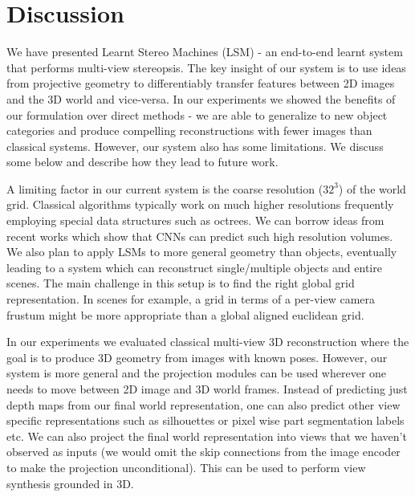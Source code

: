 \documentclass[../thesis.tex]{subfiles}
\begin{document}


\section{Discussion}
We have presented Learnt Stereo Machines (LSM) - an end-to-end learnt system that performs multi-view stereopsis. The key insight of our system is to use ideas from projective geometry to differentiably transfer features between 2D images and the 3D world and vice-versa. In our experiments we showed the benefits of our formulation over direct methods - we are able to generalize to new object categories and produce compelling reconstructions with fewer images than classical systems. However, our system also has some limitations. We discuss some below and describe how they lead to future work.

A limiting factor in our current system is the coarse resolution ($32^3$) of the world grid. Classical algorithms typically work on much higher resolutions frequently employing special data structures such as octrees. We can borrow ideas from recent works \cite{riegler2017octnetfusion,hane2017hierarchical} which show that CNNs can predict such high resolution volumes. We also plan to apply LSMs to more general geometry than objects, eventually leading to a system which can reconstruct single/multiple objects and entire scenes. The main challenge in this setup is to find the right global grid representation. In scenes for example, a grid in terms of a per-view camera frustum might be more appropriate than a global aligned euclidean grid.

In our experiments we evaluated classical multi-view 3D reconstruction where the goal is to produce 3D geometry from images with known poses. However, our system is more general and the projection modules can be used wherever one needs to move between 2D image and 3D world frames. Instead of predicting just depth maps from our final world representation, one can also predict other view specific representations such as silhouettes or pixel wise part segmentation labels etc. We can also project the final world representation into views that we haven't observed as inputs (we would omit the skip connections from the image encoder to make the projection unconditional). This can be used to perform view synthesis grounded in 3D.
\end{document}
